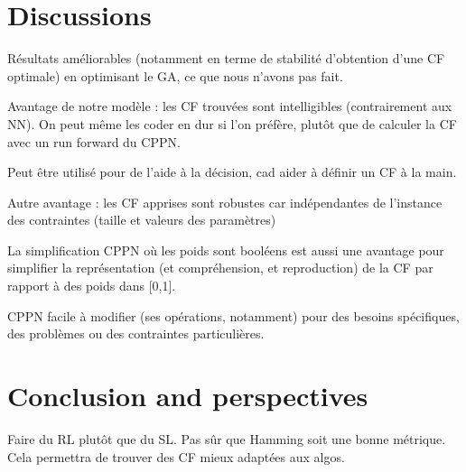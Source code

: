 \documentclass{article}
\begin{document}
\section{Discussions}

Résultats améliorables  (notamment en  terme de  stabilité d'obtention
d'une CF optimale) en optimisant le GA, ce que nous n'avons pas fait.

Avantage  de  notre  modèle  :  les  CF  trouvées  sont  intelligibles
(contrairement aux NN). On peut même les coder en dur si l'on préfère,
plutôt que de calculer la CF avec un run forward du CPPN.

Peut être utilisé pour de l'aide à la décision, cad aider à définir un
CF à la main.

Autre avantage  : les CF  apprises sont robustes car  indépendantes de
l'instance des contraintes (taille et valeurs des paramètres)

La  simplification CPPN  où  les  poids sont  booléens  est aussi  une
avantage  pour  simplifier  la représentation  (et  compréhension,  et
reproduction) de la CF par rapport à des poids dans [0,1].

CPPN facile  à modifier (ses  opérations, notamment) pour  des besoins
spécifiques, des problèmes ou des contraintes particulières.


\section{Conclusion and perspectives}\label{sec:conclusion}

Faire du  RL plutôt  que du  SL. Pas  sûr que  Hamming soit  une bonne
métrique. Cela permettra de trouver des CF mieux adaptées aux algos.




\end{document}
